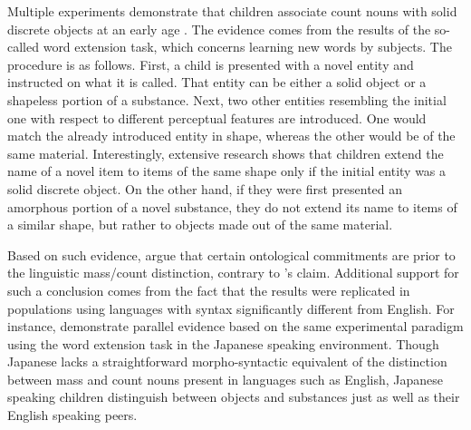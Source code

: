 Multiple experiments demonstrate that children associate count nouns with solid discrete objects at an early age \citep[see, e.g.,][]{landau_smith_jones1988importance,soja_carey_spelke1991ontological,imai_gentner1997crosslinguistic}. The evidence comes from the results of the so-called word extension task, which concerns learning new words by subjects. The procedure is as follows. First, a child is presented with a novel entity and instructed on what it is called. That entity can be either a solid object or a shapeless portion of a substance. Next, two other entities resembling the initial one with respect to different perceptual features are introduced. One would match the already introduced entity in shape, whereas the other would be of the same material. Interestingly, extensive research shows that children extend the name of a novel item to items of the same shape only if the initial entity was a solid discrete object. On the other hand, if they were first presented an amorphous portion of a novel substance, they do not extend its name to items of a similar shape, but rather to objects made out of the same material.

Based on such evidence, \citet{soja_carey_spelke1991ontological} argue that certain ontological commitments are prior to the linguistic mass/count distinction, contrary to \citeauthor{quine1960word}'s claim. Additional support for such a conclusion comes from the fact that the results were replicated in populations using languages with syntax significantly different from English. For instance, \citet{imai_gentner1997crosslinguistic} demonstrate parallel evidence based on the same experimental paradigm using the word extension task in the Japanese speaking environment. Though Japanese lacks a straightforward morpho-syntactic equivalent of the distinction between mass and count nouns present in languages such as English, Japanese speaking children distinguish between objects and substances just as well as their English speaking peers.

